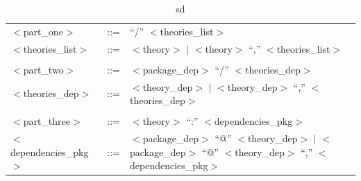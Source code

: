 \begin{table}
  \centering
    \begin{tabular}{ l l p{8cm}}
       \hline
      $<$part\_one$>$ & ::= & ``/'' $<$theories\_list$>$\\
      $<$theories\_list$>$ & ::= &  $<$theory$>$ $|$ $<$theory$>$ ``,'' $<$theories\_list$>$\\
      \\
      $<$part\_two$>$ & ::= &  $<$package\_dep$>$ ``/'' $<$theories\_dep$>$\\
      $<$theories\_dep$>$ & ::= &  $<$theory\_dep$>$ $|$ $<$theory\_dep$>$ ``,'' $<$theories\_dep$>$\\
      \\
      $<$part\_three$>$ & ::= &  $<$theory$>$ ``:'' $<$dependencies\_pkg$>$\\
      $<$dependencies\_pkg$>$ & ::= &  $<$package\_dep$>$ ``@'' $<$theory\_dep$>$ $|$ $<$package\_dep$>$ ``@'' $<$theory\_dep$>$ ``,'' $<$dependencies\_pkg$>$\\
      \hline
    \end{tabular}
    \caption{sd}
  \label{tab.bnf}
\end{table}
